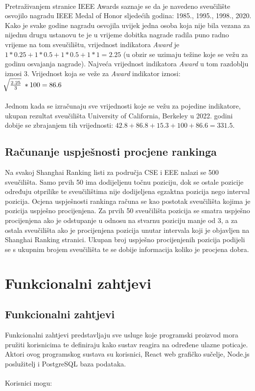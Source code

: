 \documentclass[times, utf8, zavrsni]{fer}
\begin{document}
\\ Pretraživanjem stranice IEEE Awards saznaje se da je navedeno sveučilište osvojilo nagradu IEEE Medal of Honor sljedećih godina: 1985., 1995., 1998., 2020. Kako je 
svake godine nagradu osvojila uvijek jedna osoba koja nije bila vezana za nijednu drugu ustanovu te je u vrijeme dobitka nagrade
radila puno radno vrijeme na tom sveučilištu, vrijednost 
indikatora \emph{Award} je $1*0.25+1*0.5+1*0.5+1*1 = 2.25$ (u obzir se uzimaju težine koje se vežu za godinu osvajanja nagrade). Najveća vrijednost 
indikatora \emph{Award} u tom razdoblju iznosi 3. Vrijednost koja se veže za \emph{Award} indikator iznosi: \; \\ $\sqrt[\leftroot{-2}]{\frac{2.25}{3}} \; * 100 = 86.6$
\\\\Jednom kada se izračunaju sve vrijednosti koje se vežu za pojedine indikatore,
ukupan rezultat sveučilišta University of California, Berkeley u 2022. godini dobije se zbrajanjem tih vrijednosti: $42.8+86.8+15.3+100+86.6 = 331.5$.
\section{Računanje uspješnosti procjene rankinga}
Na svakoj Shanghai Ranking listi za područja CSE i EEE nalazi se 500 sveučilišta. Samo prvih 50 ima dodijeljenu točnu poziciju, dok se ostale pozicije određuju
otprilike te sveučilištima nije dodijeljena egzaktna pozicija nego interval pozicija. Ocjena uspješnosti rankinga računa se kao postotak sveučilišta kojima je pozicija 
uspješno procijenjena. Za prvih 50 sveučilišta pozicija se smatra uspješno procijenjena ako je odstupanje u odnosu na stvarnu poziciju manje od 3, a za ostala sveučilišta 
ako je procijenjena pozicija unutar intervala koji je objavljen na Shanghai Ranking stranici. Ukupan broj uspješno procijenjenih pozicija podijeli se s ukupnim brojem 
sveučilišta te se dobije informacija koliko je procjena dobra.
\chapter{Funkcionalni zahtjevi}
\section{Funkcionalni zahtjevi}
Funkcionalni zahtjevi predstavljaju sve usluge koje programski proizvod mora pružiti korisnicima te definiraju kako sustav reagira na određene ulazne poticaje.
\\ Aktori ovog programskog sustava su korisnici, React web grafičko sučelje, Node.js poslužitelj i PostgreSQL baza podataka.
\\
\\Korisnici mogu:
\end{document}
